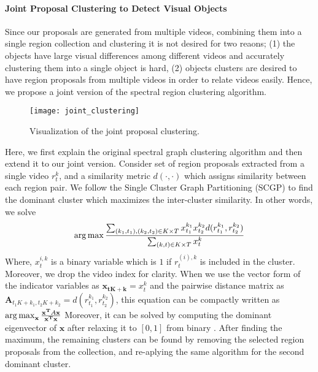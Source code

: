 \paragraph{Joint Proposal Clustering to Detect Visual Objects}
Since our proposals are generated from multiple videos, combining them into a single region collection and clustering it is not desired for two reaons; (1) the objects have large visual differences among different videos and accurately clustering them into a single object is hard, (2) objects clusters are desired to have region proposals from multiple videos in order to relate videos easily. Hence, we propose a joint version of the spectral region clustering algorithm.

\begin{figure}[ht]
  \texttt{[image: joint\_clustering]}
  \caption{Visualization of the joint proposal clustering.}
  \label{hierProposal}
\end{figure}

Here, we first explain the original spectral graph clustering algorithm and then extend it to our joint version. Consider set of region proposals extracted from a single video $r^k_t$, and a similarity metric $d(\cdot,\cdot)$ which assigns similarity between each region pair. We follow the Single Cluster Graph Partitioning (SCGP)\cite{scgp} to find the dominant cluster which maximizes the inter-cluster similarity. In other words, we solve
\begin{equation}
  \operatorname*{arg\,max} \frac{\sum_{(k_1,t_1),(k_2,t_2) \in K \times T} x^{k_1}_{t_1} x^{k_2}_{t_2} d(r^{k_1}_{t_1},r^{k_2}_{t_2})}{\sum_{(k,t) \in K \times T} x^{k}_t}
\end{equation}
Where, $x^{i,k}_t$ is a binary variable which is $1$ if $r^{(i),k}_t$ is included in the cluster. Moreover, we drop the video index for clarity. When we use the vector form of the indicator variables as $\mathbf{x_{tK+k}}=x^{k}_{t}$ and the pairwise distance matrix as $\mathbf{A}_{t_1K+k_1,t_2K+k_2}=d(r^{k_1}_{t_1},r^{k_2}_{t_2})$, this equation can be compactly written as
$\operatorname*{arg\,max}_{\mathbf{x}} \frac{\mathbf{x^T}A\mathbf{x}}{\mathbf{x^T}\mathbf{x}}$
Moreover, it can be solved by computing the dominant eigenvector of $\mathbf{x}$ after relaxing it to $[0,1]$ from binary \cite{scgp,scgp_eigen}. After finding the maximum, the remaining clusters can be found by removing the selected region proposals from the collection, and re-aplying the same algorithm for the second dominant cluster.

